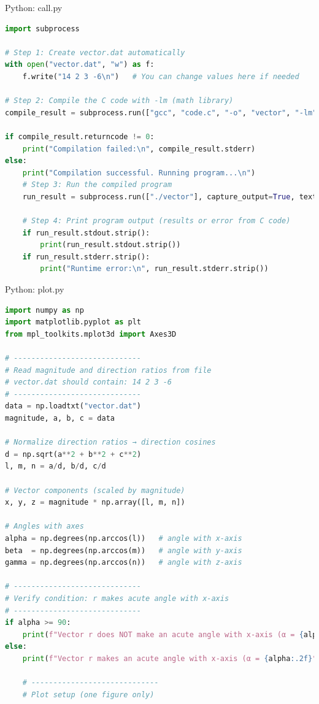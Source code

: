 \documentclass{beamer}
\numberwithin{equation}{section}
\theoremstyle{remark}
\begin{document}
\begin{frame}[fragile]{Python: call.py}
\begin{lstlisting}[language=Python]
import subprocess

# Step 1: Create vector.dat automatically
with open("vector.dat", "w") as f:
    f.write("14 2 3 -6\n")   # You can change values here if needed

# Step 2: Compile the C code with -lm (math library)
compile_result = subprocess.run(["gcc", "code.c", "-o", "vector", "-lm"], capture_output=True, text=True)

if compile_result.returncode != 0:
    print("Compilation failed:\n", compile_result.stderr)
else:
    print("Compilation successful. Running program...\n")
    # Step 3: Run the compiled program
    run_result = subprocess.run(["./vector"], capture_output=True, text=True)
    
    # Step 4: Print program output (results or error from C code)
    if run_result.stdout.strip():
        print(run_result.stdout.strip())
    if run_result.stderr.strip():
        print("Runtime error:\n", run_result.stderr.strip())

\end{lstlisting}
\end{frame}

\begin{frame}[fragile]{Python: plot.py}
\begin{lstlisting}[language=Python]
import numpy as np
import matplotlib.pyplot as plt
from mpl_toolkits.mplot3d import Axes3D

# -----------------------------
# Read magnitude and direction ratios from file
# vector.dat should contain: 14 2 3 -6
# -----------------------------
data = np.loadtxt("vector.dat")
magnitude, a, b, c = data

# Normalize direction ratios → direction cosines
d = np.sqrt(a**2 + b**2 + c**2)
l, m, n = a/d, b/d, c/d

# Vector components (scaled by magnitude)
x, y, z = magnitude * np.array([l, m, n])

# Angles with axes
alpha = np.degrees(np.arccos(l))   # angle with x-axis
beta  = np.degrees(np.arccos(m))   # angle with y-axis
gamma = np.degrees(np.arccos(n))   # angle with z-axis

# -----------------------------
# Verify condition: r makes acute angle with x-axis
# -----------------------------
if alpha >= 90:
    print(f"Vector r does NOT make an acute angle with x-axis (α = {alpha:.2f}°). No figure generated.")
else:
    print(f"Vector r makes an acute angle with x-axis (α = {alpha:.2f}°). Generating figure...")

    # -----------------------------
    # Plot setup (one figure only)
    \end{lstlisting}
\end{frame}
\end{document}
